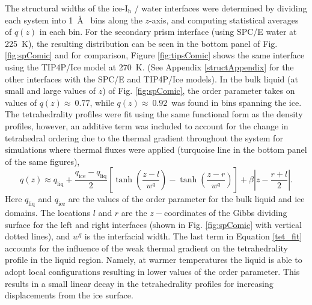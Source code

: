 The structural widths of the ice-I$_\mathrm{h}$ / water interfaces
were determined by dividing each system into 1~\AA~ bins along the
$z$-axis, and computing statistical averages of $q(z)$ in each
bin. For the secondary prism interface (using SPC/E water at 225~K),
the resulting distribution can be seen in the bottom panel of
Fig. \ref{fig:spComic} and for comparison, Figure \ref{fig:tipsComic}
shows the same interface using the TIP4P/Ice model at 270~K.  (See
Appendix \ref{structAppendix} for the other interfaces with the SPC/E
and TIP4P/Ice models). In the bulk liquid (at small and large values
of $z$) of Fig. \ref{fig:spComic}, the order parameter takes on values
of $q(z) \approx~0.77$, while $q(z) \approx~0.92$~was found in bins
spanning the ice. The tetrahedrality profiles were fit using the same
functional form as the density profiles, however, an additive term was
included to account for the change in tetrahedral ordering due to the
thermal gradient throughout the system for simulations where thermal
fluxes were applied (turquoise line in the bottom panel of the same
figures),
\begin{equation}\label{tet_fit}
q(z) \approx
q_\mathrm{liq}+\frac{q_\mathrm{ice}-q_\mathrm{liq}}{2}\left[\tanh\left(\frac{z-l}{w^q}\right)-\tanh\left(\frac{z-r}{w^q}\right)\right]+\beta\left|z-\frac{r+l}{2}\right|.
\end{equation}
Here $q_\mathrm{liq}$ and $q_\mathrm{ice}$ are the values of the order
parameter for the bulk liquid and ice domains. The locations $l$ and
$r$ are the $z-$coordinates of the Gibbs dividing surface for the left
and right interfaces (shown in Fig. \ref{fig:spComic} with vertical
dotted lines), and $w^{q}$ is the interfacial width.  The last term in
Equation \eqref{tet_fit} accounts for the influence of the weak thermal
gradient on the tetrahedrality profile in the liquid region. Namely,
at warmer temperatures the liquid is able to adopt local
configurations resulting in lower values of the order parameter. This
results in a small linear decay in the tetrahedrality profiles for
increasing displacements from the ice surface.

